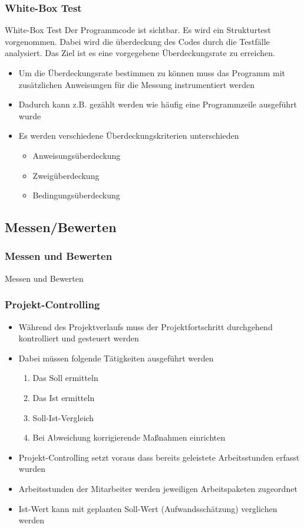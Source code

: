 \begin{frame}
\frametitle{White-Box Test}
	\begin{block}{White-Box Test}
		Der Programmcode ist sichtbar. Es wird ein Strukturtest vorgenommen. Dabei wird die
		überdeckung des Codes durch die Testfälle analysiert. Das Ziel ist es eine vorgegebene
		Überdeckungsrate zu erreichen.
	\end{block}
	\begin{itemize}
		\item Um die Überdeckungsrate bestimmen zu können muss das Programm mit zusätzlichen
					Anweisungen für die Messung instrumentiert werden
		\item Dadurch kann z.B. gezählt werden wie häufig eine Programmzeile ausgeführt wurde
		\item Es werden verschiedene Überdeckungskriterien unterschieden
					\begin{itemize}
						\item Anweisungsüberdeckung
						\item Zweigüberdeckung
						\item Bedingungsüberdeckung
					\end{itemize}
	\end{itemize}
\end{frame}

\subsection{Messen/Bewerten}
\begin{frame}
\frametitle{Messen und Bewerten}
\huge Messen und Bewerten
\end{frame}

\begin{frame}
\frametitle{Projekt-Controlling}
	\begin{itemize}
		\item Während des Projektverlaufs muss der Projektfortschritt durchgehend kontrolliert
					und gesteuert werden
		\item Dabei müssen folgende Tätigkeiten ausgeführt werden
					\begin{enumerate}
						\item Das Soll ermitteln
						\item Das Ist ermitteln
						\item Soll-Ist-Vergleich
						\item Bei Abweichung korrigierende Maßnahmen einrichten
					\end{enumerate}
		\item Projekt-Controlling setzt voraus dass bereits geleistete Arbeitsstunden erfasst wurden
		\item Arbeitsstunden der Mitarbeiter werden jeweiligen Arbeitspaketen zugeordnet
		\item Ist-Wert kann mit geplanten Soll-Wert (Aufwandsschätzung) verglichen werden
	\end{itemize}
\end{frame}

